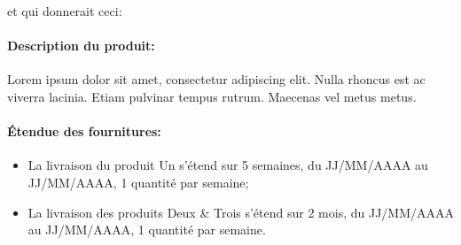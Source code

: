 \documentclass[a4paper,10pt]{article}
\begin{document}
et qui donnerait ceci: \\

\paragraph*{Description du produit:}
 Lorem ipsum dolor sit amet, consectetur adipiscing elit. Nulla rhoncus est ac viverra lacinia. Etiam pulvinar tempus rutrum. Maecenas vel metus metus. 

\paragraph*{\'{E}tendue des fournitures:}
\begin{itemize}
    \item La livraison du produit Un s'étend sur 5 semaines, du JJ/MM/AAAA au JJ/MM/AAAA, 1 quantité par semaine;
    \item La livraison des produits Deux \& Trois s'étend sur 2 mois, du JJ/MM/AAAA au JJ/MM/AAAA, 1 quantité par semaine.
\end{itemize}
\end{document}
